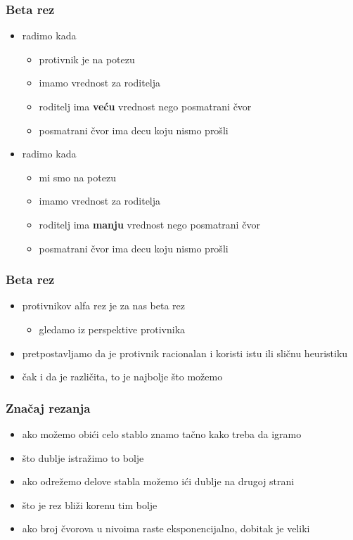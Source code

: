 \documentclass[compress,aspectratio=169]{beamer}
\begin{document}
\begin{frame}[fragile]
  \frametitle{Beta rez}
  \begin{itemize}
    \item \textbf{} radimo kada
    \begin{itemize}
      \item protivnik je na potezu
      \item imamo vrednost za roditelja
      \item roditelj ima \textbf{veću} vrednost nego posmatrani čvor
      \item posmatrani čvor ima decu koju nismo prošli
    \end{itemize}
    \item \textbf{} radimo kada
    \begin{itemize}
      \item mi smo na potezu
      \item imamo vrednost za roditelja
      \item roditelj ima \textbf{manju} vrednost nego posmatrani čvor
      \item posmatrani čvor ima decu koju nismo prošli
    \end{itemize}
  \end{itemize}
\end{frame}

\begin{frame}[fragile]
  \frametitle{Beta rez}
  \begin{itemize}
    \item protivnikov alfa rez je za nas beta rez
    \begin{itemize}
      \item gledamo iz perspektive protivnika
    \end{itemize}
    \item pretpostavljamo da je protivnik racionalan i koristi istu ili sličnu heuristiku
    \item čak i da je različita, to je najbolje što možemo
  \end{itemize}
\end{frame}

\begin{frame}[fragile]
  \frametitle{Značaj rezanja}
  \begin{itemize}
    \item ako možemo obići celo stablo znamo tačno kako treba da igramo
    \item što dublje istražimo to bolje
    \item ako odrežemo delove stabla možemo ići dublje na drugoj strani
    \item što je rez bliži korenu tim bolje
    \item ako broj čvorova u nivoima raste eksponencijalno, dobitak je veliki
  \end{itemize}
\end{frame}
\end{document}
